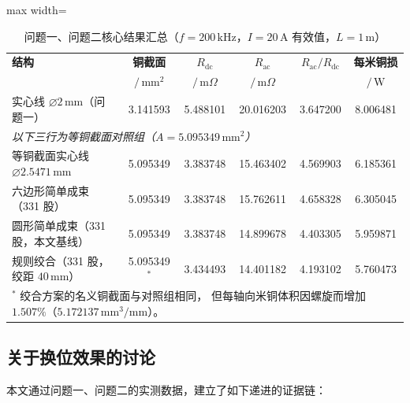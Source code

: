 \documentclass[12pt, a4paper]{ctexart}
\newcommand{\Rac}{R_{\mathrm{ac}}}
\newcommand{\Rdc}{R_{\mathrm{dc}}}
\newcommand{\U}[1]{\ensuremath{\,\mathrm{#1}}}
\newcommand{\Umohm}{\ensuremath{\,\mathrm{m}\Omega}}%
\begin{document}
\begin{table}[H]
\centering
\caption{问题一、问题二核心结果汇总（$f = 200\U{kHz}$，$I = 20\U{A}$ 有效值，$L = 1\U{m}$）}
\label{tab:all-results}
\small
\begin{adjustbox}{max width=\textwidth}
\begin{tabular}{l c c c c c}
\toprule
\textbf{结构} & \textbf{铜截面} & $\Rdc$ & $\Rac$ & $\Rac/\Rdc$ & \textbf{每米铜损} \\
 & $/\U{mm^2}$ & $/\Umohm$ & $/\Umohm$ & & $/\U{W}$ \\
\midrule
实心线 $\varnothing 2\U{mm}$（问题一） & 3.141593 & 5.488101 & 20.016203 & 3.647200 & 8.006481 \\
\midrule
\multicolumn{6}{l}{\textit{以下三行为等铜截面对照组（$A = 5.095349\U{mm^2}$）}} \\
等铜截面实心线 $\varnothing 2.5471\U{mm}$ & 5.095349 & 3.383748 & 15.463402 & 4.569903 & 6.185361 \\
六边形简单成束（331 股）                     & 5.095349 & 3.383748 & 15.762611 & 4.658328 & 6.305045 \\
圆形简单成束（331 股，本文基线）             & 5.095349 & 3.383748 & 14.899678 & 4.403305 & 5.959871 \\
\midrule
规则绞合（331 股，绞距 $40\U{mm}$）       & 5.095349$^{*}$ & 3.434493 & 14.401182 & 4.193102 & 5.760473 \\
\bottomrule
\multicolumn{6}{l}{\footnotesize $^{*}$ 绞合方案的名义铜截面与对照组相同，
但每轴向米铜体积因螺旋而增加 $1.507\%$（$5.172137\U{mm^3/mm}$）。}
\end{tabular}
\end{adjustbox}
\end{table}

\subsection{关于换位效果的讨论}

本文通过问题一、问题二的实测数据，建立了如下递进的证据链：
\end{document}
